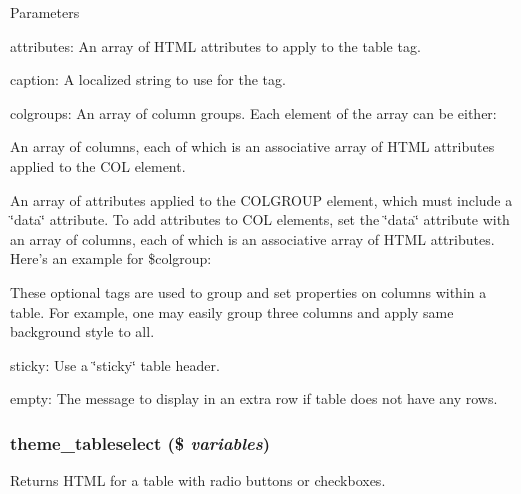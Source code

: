 \begin{DoxyParams}{Parameters}
\begin{DoxyItemize}
\begin{DoxyItemize}
\end{DoxyItemize}
\item attributes: An array of HTML attributes to apply to the table tag.
\item caption: A localized string to use for the  tag.
\item colgroups: An array of column groups. Each element of the array can be either:
\begin{DoxyItemize}
\item An array of columns, each of which is an associative array of HTML attributes applied to the COL element.
\item An array of attributes applied to the COLGROUP element, which must include a \char`\"{}data\char`\"{} attribute. To add attributes to COL elements, set the \char`\"{}data\char`\"{} attribute with an array of columns, each of which is an associative array of HTML attributes. Here's an example for \$colgroup: 
 These optional tags are used to group and set properties on columns within a table. For example, one may easily group three columns and apply same background style to all.
\end{DoxyItemize}
\item sticky: Use a \char`\"{}sticky\char`\"{} table header.
\item empty: The message to display in an extra row if table does not have any rows. 
\end{DoxyItemize}\end{DoxyParams}
\hypertarget{group__themeable_ga5cc90870843319efb27065ce5db8e413}{
\subsubsection[{theme\_\-tableselect}]{\setlength{\rightskip}{0pt plus 5cm}theme\_\-tableselect (\$ {\em variables})}}
\label{group__themeable_ga5cc90870843319efb27065ce5db8e413}
Returns HTML for a table with radio buttons or checkboxes.


